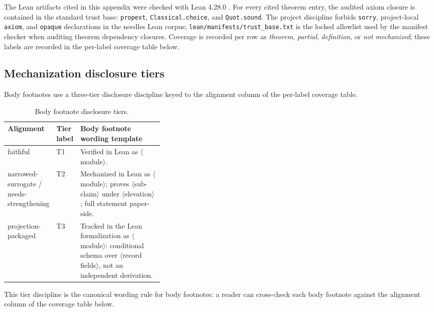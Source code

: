 \documentclass[11pt]{article}
\theoremstyle{definition}
\begin{document}
The Lean artifacts cited in this appendix were checked with Lean 4.28.0 \citep{deMouraUllrich2021Lean4,MathlibCommunity2020Lean}.  For every cited theorem entry, the audited axiom closure is contained in the standard trust base: \texttt{propext}, \texttt{Classical.choice}, and \texttt{Quot.sound}.  The project discipline forbids \texttt{sorry}, project-local \texttt{axiom}, and \texttt{opaque} declarations in the needles Lean corpus; \texttt{lean/manifests/trust\_base.txt} is the locked allowlist used by the manifest checker when auditing theorem dependency closures.  Coverage is recorded per row as \emph{theorem}, \emph{partial}, \emph{definition}, or \emph{not mechanized}; these labels are recorded in the per-label coverage table below.

\subsection{Mechanization disclosure tiers}
\label{subsec:paper1-mechanization-disclosure-tiers}

Body footnotes use a three-tier disclosure discipline keyed to the alignment column of the per-label coverage table.

\begin{table}[H]
  \centering
  \small
  \begin{tabularx}{\linewidth}{>{\raggedright\arraybackslash}p{0.25\linewidth} >{\raggedright\arraybackslash}p{0.11\linewidth} >{\raggedright\arraybackslash}X}
    \toprule
    Alignment & Tier label & Body footnote wording template \\
    \midrule
    faithful & T1 & Verified in Lean as \(\langle\)module\(\rangle\). \\
    narrowed-surrogate / needs-strengthening & T2 & Mechanized in Lean as \(\langle\)module\(\rangle\); proves \(\langle\)sub-claim\(\rangle\) under \(\langle\)elevation\(\rangle\); full statement paper-side. \\
    projection-packaged & T3 & Tracked in the Lean formalization as \(\langle\)module\(\rangle\): conditional schema over \(\langle\)record fields\(\rangle\), not an independent derivation. \\
    \bottomrule
  \end{tabularx}
  \caption{Body footnote disclosure tiers.}
  \label{tab:paper1-mechanization-disclosure-tiers}
\end{table}

This tier discipline is the canonical wording rule for body footnotes: a reader can cross-check each body footnote against the alignment column of the coverage table below.
\end{document}
